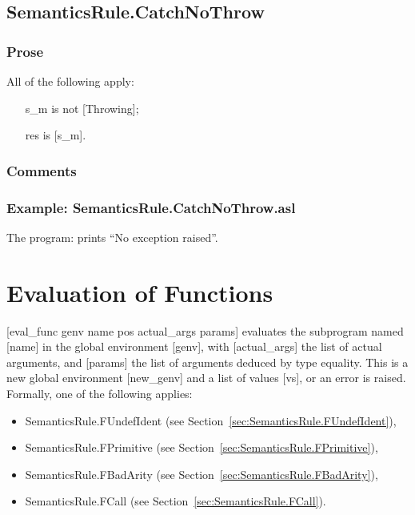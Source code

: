 \documentclass{book}
\begin{document}
\section{SemanticsRule.CatchNoThrow \label{sec:SemanticsRule.CatchNoThrow}}

    \subsection{Prose}
    All of the following apply:
    \begin{itemize}
    \item [s\_m] is not [Throwing];
    \item [res] is [s\_m].
    \end{itemize}

    \subsection{Comments}

    \subsection{Example: SemanticsRule.CatchNoThrow.asl}
    The program:
    prints ``No exception raised''.

\chapter{Evaluation of Functions \label{chap:eval_func}}
[eval\_func genv name pos actual\_args params] evaluates the subprogram named
[name] in the global environment [genv], with [actual\_args] the list of actual
arguments, and [params] the list of arguments deduced by type equality. This is
a new global environment [new\_genv] and a list of values [vs], or an error is
raised. Formally, one of the following applies:
\begin{itemize}
\item SemanticsRule.FUndefIdent (see Section~\ref{sec:SemanticsRule.FUndefIdent}),
\item SemanticsRule.FPrimitive (see Section~\ref{sec:SemanticsRule.FPrimitive}),
\item SemanticsRule.FBadArity (see Section~\ref{sec:SemanticsRule.FBadArity}),
\item SemanticsRule.FCall (see Section~\ref{sec:SemanticsRule.FCall}).
\end{itemize}
\end{document}
